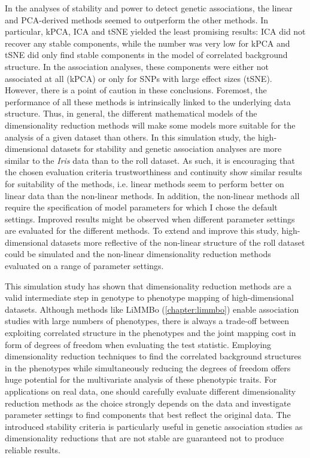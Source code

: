 In the analyses of stability and power to detect genetic associations, the linear and PCA-derived methods seemed to outperform the other methods. In particular, kPCA, ICA and tSNE yielded the least promising results: ICA did not recover any stable components, while the number was very low for kPCA and tSNE did only find stable components in the model of correlated background structure. In the association analyses, these components were either not associated at all (kPCA) or only for SNPs with large effect sizes (tSNE). However, there is a point of caution in these conclusions. Foremost, the performance of all these methods is intrinsically linked to the underlying data structure. Thus, in general, the different mathematical models of the dimensionality reduction methods will make some models more suitable for the analysis of a given dataset than others. In this simulation study, the high-dimensional datasets for stability and genetic association analyses are more similar to the \textit{Iris} data than to the roll dataset. As such, it is encouraging that the chosen evaluation criteria trustworthiness and continuity show similar results for suitability of the methods, i.e. linear methods seem to perform better on linear data than the non-linear methods. In addition, the non-linear methods all require the specification of model parameters for which I chose the default settings. Improved results might be observed when different parameter settings are evaluated for the different methods. To extend and improve this study, high-dimensional datasets more reflective of the non-linear structure of the roll dataset could be simulated and the non-linear dimensionality reduction methods evaluated on a range of parameter settings. 

This simulation study has shown that dimensionality reduction methods are a valid intermediate step in genotype to phenotype mapping of high-dimensional datasets. Although methods like LiMMBo (\cref{chapter:limmbo}) enable association studies with large numbers of phenotypes, there is always a trade-off between exploiting correlated structure in the phenotypes and the joint mapping cost in form of degrees of freedom when evaluating the test statistic. Employing dimensionality reduction techniques to find the correlated background structures in the phenotypes while simultaneously reducing the degrees of freedom offers huge potential for the multivariate analysis of these phenotypic traits. For applications on real data, one should carefully evaluate different dimensionality reduction methods as the choice strongly depends on the data and investigate parameter settings to find components that best reflect the original data. The introduced stability criteria is particularly useful in genetic association studies as dimensionality reductions that are not stable are guaranteed not to produce reliable results.




